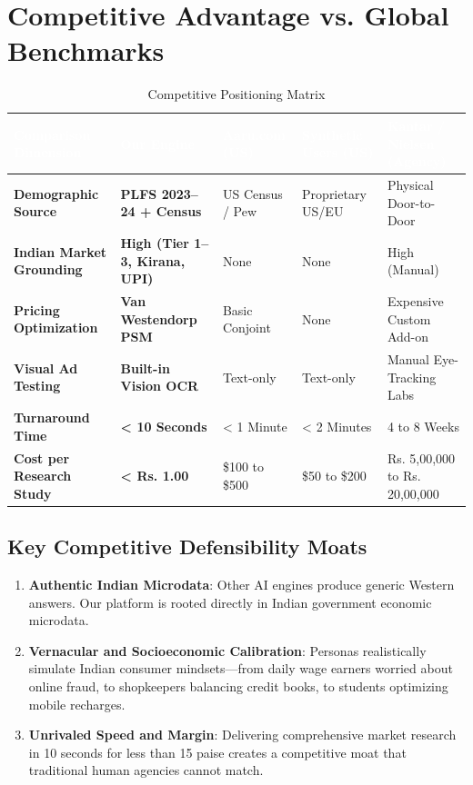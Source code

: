 \documentclass[11pt,a4paper]{article}
\begin{document}
\newpage
\section{Competitive Advantage vs. Global Benchmarks}

\begin{table}[htbp]
\centering
\small
\setlength{\aboverulesep}{0pt}
\setlength{\belowrulesep}{0pt}
\setlength{\tabcolsep}{5pt}
\renewcommand{\arraystretch}{1.25}
\begin{tabularx}{\textwidth}{lXXXX}
\toprule
\rowcolor{tblheaderblue}
\textcolor{white}{\textbf{Comparison Dimension}} & \textcolor{white}{\textbf{Our Engine}} & \textcolor{white}{\textbf{Aaru.com (US)}} & \textcolor{white}{\textbf{Synthetic Users (US)}} & \textcolor{white}{\textbf{Kantar / Nielsen (Agency)}} \\
\midrule
\textbf{Demographic Source} & \textbf{PLFS 2023--24 + Census} & US Census / Pew & Proprietary US/EU & Physical Door-to-Door \\
\textbf{Indian Market Grounding} & \textbf{High (Tier 1--3, Kirana, UPI)} & None & None & High (Manual) \\
\textbf{Pricing Optimization} & \textbf{Van Westendorp PSM} & Basic Conjoint & None & Expensive Custom Add-on \\
\textbf{Visual Ad Testing} & \textbf{Built-in Vision OCR} & Text-only & Text-only & Manual Eye-Tracking Labs \\
\textbf{Turnaround Time} & \textbf{< 10 Seconds} & < 1 Minute & < 2 Minutes & 4 to 8 Weeks \\
\textbf{Cost per Research Study} & \textbf{< Rs. 1.00} & \$100 to \$500 & \$50 to \$200 & Rs. 5,00,000 to Rs. 20,00,000 \\
\bottomrule
\end{tabularx}
\caption{Competitive Positioning Matrix}
\end{table}

\subsection{Key Competitive Defensibility Moats}
\begin{enumerate}
  \item \textbf{Authentic Indian Microdata}: Other AI engines produce generic Western answers. Our platform is rooted directly in Indian government economic microdata.
  \item \textbf{Vernacular and Socioeconomic Calibration}: Personas realistically simulate Indian consumer mindsets---from daily wage earners worried about online fraud, to shopkeepers balancing credit books, to students optimizing mobile recharges.
  \item \textbf{Unrivaled Speed and Margin}: Delivering comprehensive market research in 10 seconds for less than 15 paise creates a competitive moat that traditional human agencies cannot match.
\end{enumerate}
\end{document}
